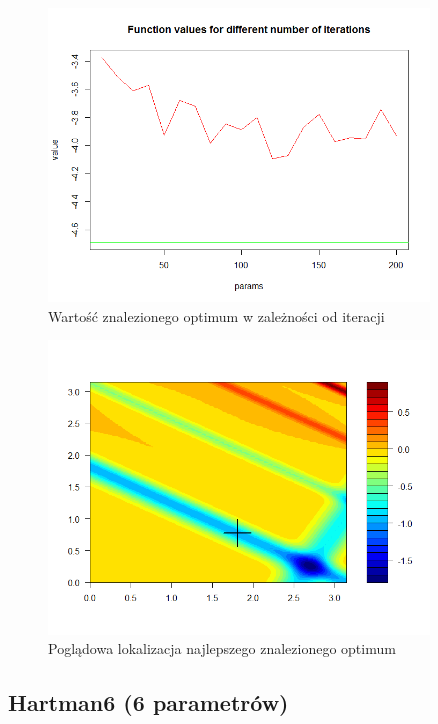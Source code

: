\documentclass[11pt, a4paper]{article}
\begin{document}
\begin{figure}[H]
	\begin{center}
		\includegraphics[width=0.9\textwidth]{./assets/EMichalewicz6.png} %
		\caption{Wartość znalezionego optimum w zależności od iteracji}
		\label{fig:gulf7}
	\end{center}
\end{figure}
\begin{figure}[H]
	\begin{center}
		\includegraphics[width=0.9\textwidth]{./assets/EMichalewicz7.png} %
		\caption{Poglądowa lokalizacja najlepszego znalezionego optimum}
		\label{fig:gulf7}
	\end{center}
\end{figure}

\subsection{Hartman6 (6 parametrów)}
\end{document}
